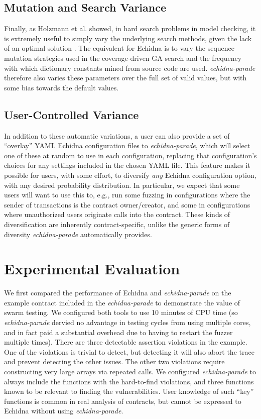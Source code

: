 \documentclass[sigconf]{acmart}
\begin{document}
{\subsection{Mutation and Search Variance}

Finally, as Holzmann et al. showed, in hard search problems in model
checking, it is extremely useful to simply vary the underlying search
methods, given the lack of an optimal solution \cite{swarmIEEE}.  The
equivalent for Echidna is to vary the sequence mutation strategies
used in the coverage-driven GA search and the frequency with which
dictionary constants mined from source code are used.
\emph{echidna-parade} therefore also varies these parameters over the
full set of valid values, but with some bias towards the default values.

\subsection{User-Controlled Variance}

In addition to these automatic variations, a user can also provide a
set of ``overlay'' YAML Echidna configuration files to
\emph{echidna-parade}, which will select one of these at random to use
in each configuration, replacing that configuration's choices for any
settings included in the chosen YAML file.  This feature makes it possible for users, with some effort, to diversify \emph{any} Echidna configuration option, with any desired probability distribution.  In particular, we expect that some users will want to use this to, e.g.,  run some fuzzing in configurations where the sender of transactions is the contract owner/creator, and some in configurations where unauthorized users originate calls into the contract.  These kinds of diversification are inherently contract-specific, unlike the generic forms of diversity \emph{echidna-parade} automatically provides.

\section{Experimental Evaluation}

We first compared the performance of Echidna and \emph{echidna-parade} on the example contract included in the \emph{echidna-parade} to demonstrate the value of swarm testing.  We configured both tools to use 10 minutes of CPU time (so \emph{echidna-parade} dervied no advantage in testing cycles from using multiple cores, and in fact paid a substantial overhead due to having to restart the fuzzer multiple times).  There are three detectable assertion violations in the example.  One of the violations is trivial to detect, but detecting it will also abort the trace and prevent detecting the other issues.  The other two violations require constructing very large arrays via repeated calls.  We configured \emph{echidna-parade} to always include the functions with the hard-to-find violations, and three functions known to be relevant to finding the vulnerabilities.  User knowledge of such ``key'' functions is common in real analysis of contracts, but cannot be expressed to Echidna without using \emph{echidna-parade}.

}
\end{document}
